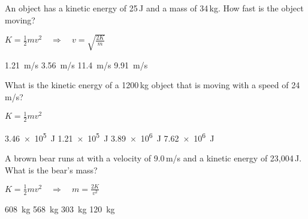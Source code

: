 \documentclass[]{exam}
\begin{document}
\begin{questions}
\question %
An object has a kinetic energy of 25\,J and a mass of 34\,kg. How fast is the object moving? 

\ifprintanswers
{\color{red}
$K = \frac{1}{2} m v^2 \quad \Rightarrow \quad v = \sqrt{\frac{2K}{m}}$
}
\fi

\begin{randomizechoices}
    \correctchoice \SI{1.21}{m/s}
    \choice \SI{3.56}{m/s}
    \choice \SI{11.4}{m/s}
    \choice \SI{9.91}{m/s}
\end{randomizechoices}



     
\question %
What is the kinetic energy of a 1200\,kg object that is moving with a speed of 24\,m/s? 

\ifprintanswers
{\color{red}
$K = \frac{1}{2} m v^2$
}
\fi


\begin{randomizechoices}
    \correctchoice \SI{3.46e5}{J}
    \choice \SI{1.21e5}{J}
    \choice \SI{3.89e6}{J}
    \choice \SI{7.62e6}{J}
\end{randomizechoices}


\question %
A brown bear runs at with a velocity of 9.0\,m/s and a kinetic energy of 23,004\,J. What is the bear’s mass?

\ifprintanswers
{\color{red}
$K = \frac{1}{2} m v^2 \quad \Rightarrow \quad m = \frac{2K}{v^2}$
}
\fi

\begin{randomizechoices}
    \choice \SI{608}{kg}
    \correctchoice \SI{568}{kg}
    \choice \SI{303}{kg}
    \choice \SI{120}{kg}
\end{randomizechoices}






\end{questions}
\end{document}
